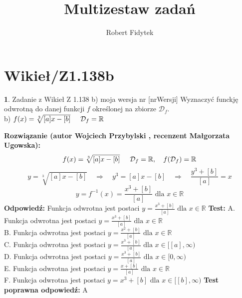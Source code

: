 \documentclass[12pt, a4paper]{article}
\title{Multizestaw zadań}
\author{Robert Fidytek}
\date{}
\theoremstyle{definition} %
\newtheorem{zad}{}
\newcommand{\kategoria}[1]{\section{#1}} %
\newcommand{\zadStart}[1]{\begin{zad}#1\newline} %
\newcommand{\zadStop}{\end{zad}}   %
\newcommand{\rozwStart}[2]{\noindent \textbf{Rozwiązanie (autor #1 , recenzent #2): }\newline} %
\newcommand{\rozwStop}{\newline}                                            %
\newcommand{\odpStart}{\noindent \textbf{Odpowiedź:}\newline}    %
\newcommand{\odpStop}{\newline}                                             %
\newcommand{\testStart}{\noindent \textbf{Test:}\newline} %
\newcommand{\testStop}{\newline} %
\newcommand{\kluczStart}{\noindent \textbf{Test poprawna odpowiedź:}\newline} %
\newcommand{\kluczStop}{\newline} %
\begin{document}
\maketitle


\kategoria{Wikieł/Z1.138b}
\zadStart{Zadanie z Wikieł Z 1.138 b) moja wersja nr [nrWersji]}
Wyznaczyć funckję odwrotną do danej funkcji $f$ określonej na zbiorze $\mathcal{D}_{f}$.\\
b) $f(x)=\sqrt[3]{[a]x-[b]}\hspace{5mm}\mathcal{D}_{f}=\mathbb{R}$
\zadStop
\rozwStart{Wojciech Przybylski}{Małgorzata Ugowska}
$$f(x)=\sqrt[3]{[a]x-[b]}\hspace{5mm} \mathcal{D}_{f}=\mathbb{R}, \quad f(\mathcal{D}_{f})=\mathbb{R}$$
$$y=\sqrt[3]{[a]x-[b]} \quad \Rightarrow \quad y^{3}=[a]x-[b] \quad \Rightarrow \quad \frac{y^{3}+[b]}{[a]}=x$$
$$y=f^{-1}(x)=\frac{x^{3}+[b]}{[a]} \mbox{ dla } x\in \mathbb{R} $$
\rozwStop
\odpStart
Funkcja odwrotna jest postaci $y=\frac{x^{3}+[b]}{[a]} \mbox{ dla }x\in \mathbb{R}$
\odpStop
\testStart
A. Funkcja odwrotna jest postaci $y=\frac{x^{3}+[b]}{[a]} \mbox{ dla }x\in \mathbb{R}$\\
B. Funkcja odwrotna jest postaci $y=\frac{x^{2}+[b]}{[a]} \mbox{ dla }x\in \mathbb{R}$\\
C. Funkcja odwrotna jest postaci $y=\frac{x^{3}+[b]}{[a]} \mbox{ dla }x\in[[a],\infty)$\\
D. Funkcja odwrotna jest postaci $y=\frac{x^{3}+[b]}{[a]} \mbox{ dla }x\in[0,\infty)$\\
E. Funkcja odwrotna jest postaci $y=\frac{x+[b]}{[a]} \mbox{ dla }x\in \mathbb{R}$\\
F. Funkcja odwrotna jest postaci $y=x^{3}+[b]\mbox{ dla }x\in[[b],\infty)$
\testStop
\kluczStart
A
\kluczStop
\end{document}
